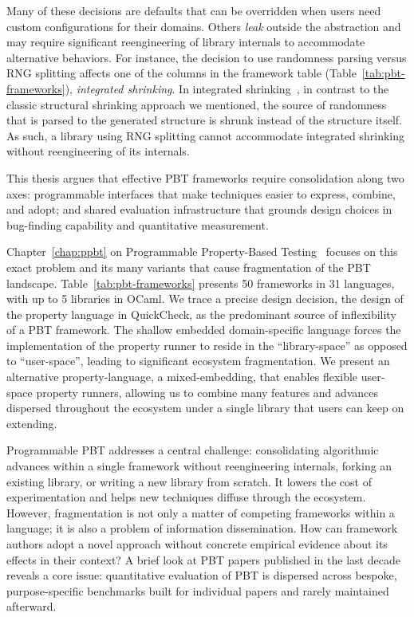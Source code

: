 Many of these decisions are defaults that can be overridden when users need custom
configurations for their domains. Others \emph{leak} outside the abstraction and may
require significant reengineering of library internals to accommodate alternative
behaviors. For instance, the decision to use randomness parsing versus RNG splitting
affects one of the columns in the framework table (Table~\ref{tab:pbt-frameworks}),
\emph{integrated shrinking}. In integrated shrinking~\cite{HypothesisShrinking}, in
contrast to the classic structural shrinking approach we mentioned, the source of
randomness that is parsed to the generated structure is shrunk instead of the structure
itself. As such, a library using RNG splitting cannot accommodate integrated shrinking
without reengineering of its internals.

This thesis argues that effective PBT frameworks require consolidation along two axes:
programmable interfaces that make techniques easier to express, combine, and adopt; and
shared evaluation infrastructure that grounds design choices in bug-finding capability
and quantitative measurement.

Chapter~\ref{chap:ppbt} on Programmable Property-Based
Testing~\cite{keles2026programmablepropertybasedtesting} focuses on this exact problem
and its many variants that cause fragmentation of the PBT landscape.
Table~\ref{tab:pbt-frameworks} presents 50 frameworks in 31 languages, with up to 5
libraries in OCaml. We trace a precise design decision, the design of the property
language in QuickCheck, as the predominant source of inflexibility of a PBT framework.
%
The shallow embedded domain-specific language forces the implementation of the property
runner to reside in the ``library-space'' as opposed to ``user-space'', leading to
significant ecosystem fragmentation.
%
We present an alternative property-language, a mixed-embedding, that enables flexible
user-space property runners, allowing us to combine many features and advances
dispersed throughout the ecosystem under a single library that users can keep on
extending.

Programmable PBT addresses a central challenge: consolidating algorithmic advances
within a single framework without reengineering internals, forking an existing library,
or writing a new library from scratch. It lowers the cost of experimentation and helps
new techniques diffuse through the ecosystem. However, fragmentation is not only a
matter of competing frameworks within a language; it is also a problem of information
dissemination. How can framework authors adopt a novel approach without concrete
empirical evidence about its effects in their context? A brief look at PBT papers
published in the last decade reveals a core issue: quantitative evaluation of PBT is
dispersed across bespoke, purpose-specific benchmarks built for individual papers and
rarely maintained afterward.

